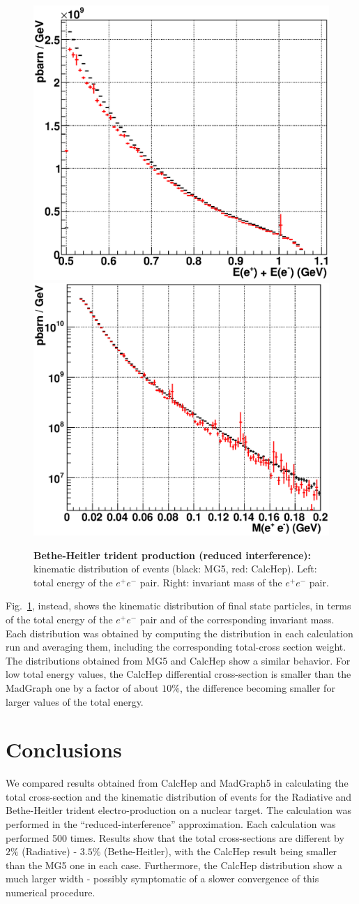 \documentclass{article}
\begin{document}
\begin{figure}[tpb]
\centering
\includegraphics[width=.48\textwidth]{img/BH_esum.eps}
\includegraphics[width=.48\textwidth]{img/BH_mass.eps}
\caption{\label{fig:bh-kin} \textbf{Bethe-Heitler trident production (reduced interference):} kinematic distribution of events (black: MG5, red: CalcHep). Left: total energy of the $e^+ e^-$ pair. Right: invariant mass of the $e^+ e^-$ pair.}
\end{figure}

Fig.~\ref{fig:bh-kin}, instead, shows the kinematic distribution of final state particles, in terms of the total energy of the $e^+ e^-$ pair and of the corresponding invariant mass. Each distribution was obtained by computing the distribution in each calculation run and averaging them, including the corresponding total-cross section weight. The distributions obtained from MG5 and CalcHep show a similar behavior. For low total energy values, the CalcHep differential cross-section is smaller than the MadGraph one by a factor of about $10\%$, the difference becoming smaller for larger values of the total energy.

\section{Conclusions}

We compared results obtained from CalcHep and MadGraph5 in calculating the total cross-section and the kinematic distribution of events for the Radiative and Bethe-Heitler trident electro-production on a nuclear target. The calculation was performed in the ``reduced-interference'' approximation. Each calculation was performed 500 times. Results show that the total cross-sections are different by $2\%$ (Radiative) - $3.5\%$ (Bethe-Heitler), with the CalcHep result being smaller than the MG5 one in each case. Furthermore, the CalcHep distribution show a much larger width - possibly symptomatic of a slower convergence of this numerical procedure.
\end{document}
